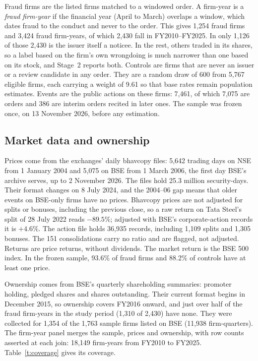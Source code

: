 \documentclass[letterpaper,11pt,leqno]{article}
\begin{document}
Fraud firms are the listed firms matched to a windowed order. A firm-year is a \emph{fraud firm-year} if the financial year (April to March) overlaps a window, which dates fraud to the conduct and never to the order. This gives 1,254 fraud firms and 3,424 fraud firm-years, of which 2,430 fall in FY2010--FY2025. In only 1,126 of those 2,430 is the issuer itself a noticee. In the rest, others traded in its shares, so a label based on the firm's own wrongdoing is much narrower than one based on its stock, and Stage~2 reports both. Controls are firms that are never an issuer or a review candidate in any order. They are a random draw of 600 from 5,767 eligible firms, each carrying a weight of 9.61 so that base rates remain population estimates. Events are the public actions on these firms: 7,461, of which 7,075 are orders and 386 are interim orders recited in later ones. The sample was frozen once, on 13 November 2026, before any estimation.

\subsection{Market data and ownership}\label{s:market}

Prices come from the exchanges' daily bhavcopy files: 5,642 trading days on NSE from 1 January 2004 and 5,075 on BSE from 1 March 2006, the first day BSE's archive serves, up to 2 November 2026. The files hold 25.3 million security-days. Their format changes on 8 July 2024, and the 2004--06 gap means that older events on BSE-only firms have no prices. Bhavcopy prices are not adjusted for splits or bonuses, including the previous close, so a raw return on Tata Steel's split of 28 July 2022 reads $-89.5\%$; adjusted with BSE's corporate-action records it is $+4.6\%$. The action file holds 36,935 records, including 1,109 splits and 1,305 bonuses. The 151 consolidations carry no ratio and are flagged, not adjusted. Returns are price returns, without dividends. The market return is the BSE 500 index. In the frozen sample, 93.6\% of fraud firms and 88.2\% of controls have at least one price.

Ownership comes from BSE's quarterly shareholding summaries: promoter holding, pledged shares and shares outstanding. Their current format begins in December 2015, so ownership covers FY2016 onward, and just over half of the fraud firm-years in the study period (1,310 of 2,430) have none. They were collected for 1,354 of the 1,763 sample firms listed on BSE (11,938 firm-quarters). The firm-year panel merges the sample, prices and ownership, with row counts asserted at each join: 18,149 firm-years from FY2010 to FY2025. Table~\ref{t:coverage} gives its coverage.
\end{document}
